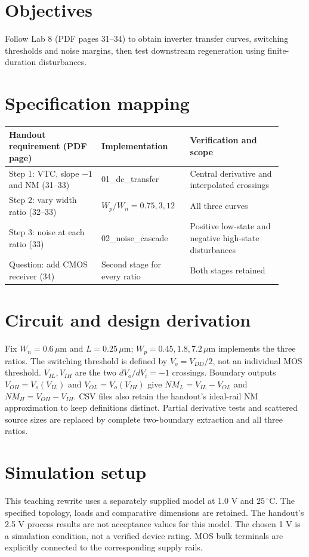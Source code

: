 \section{Objectives}
Follow Lab 8 (PDF pages 31--34) to obtain inverter transfer curves, switching thresholds and noise margins, then test downstream regeneration using finite-duration disturbances.

\section{Specification mapping}
\begin{longtable}{p{0.31\linewidth}p{0.29\linewidth}p{0.31\linewidth}}
\toprule
Handout requirement (PDF page) & Implementation & Verification and scope \\\midrule
Step 1: VTC, slope $-1$ and NM (31--33) & 01\_dc\_transfer & Central derivative and interpolated crossings \\
Step 2: vary width ratio (32--33) & $W_p/W_n=0.75,3,12$ & All three curves \\
Step 3: noise at each ratio (33) & 02\_noise\_cascade & Positive low-state and negative high-state disturbances \\
Question: add CMOS receiver (34) & Second stage for every ratio & Both stages retained \\
\bottomrule
\end{longtable}


\section{Circuit and design derivation}
Fix $W_n=0.6\,\mu$m and $L=0.25\,\mu$m; $W_p=0.45,1.8,7.2\,\mu$m implements the three ratios. The switching threshold is defined by $V_o=V_{DD}/2$, not an individual MOS threshold. $V_{IL},V_{IH}$ are the two $dV_o/dV_i=-1$ crossings. Boundary outputs $V_{OH}=V_o(V_{IL})$ and $V_{OL}=V_o(V_{IH})$ give $NM_L=V_{IL}-V_{OL}$ and $NM_H=V_{OH}-V_{IH}$. CSV files also retain the handout's ideal-rail NM approximation to keep definitions distinct. Partial derivative tests and scattered source sizes are replaced by complete two-boundary extraction and all three ratios.

\section{Simulation setup}
This teaching rewrite uses a separately supplied model at 1.0 V and $25\,^{\circ}\mathrm C$. The specified topology, loads and comparative dimensions are retained. The handout's 2.5 V process results are not acceptance values for this model. The chosen 1 V is a simulation condition, not a verified device rating. MOS bulk terminals are explicitly connected to the corresponding supply rails.

